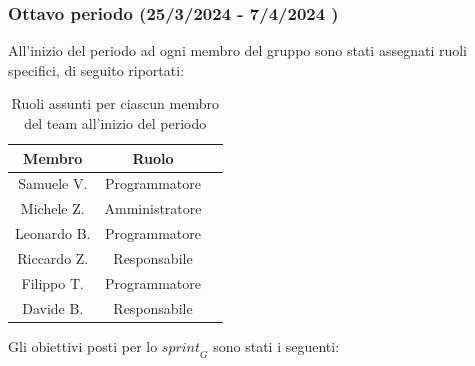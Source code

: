 \subsubsection{Ottavo periodo (25/3/2024 - 7/4/2024 )}
All'inizio del periodo ad ogni membro del gruppo sono stati assegnati ruoli specifici, di seguito riportati:
\begin{table}[H]
\centering
\begin{tabular}{|c|c|c|}
\hline
\textbf{Membro} & \textbf{Ruolo} \\
\hline
Samuele V. & Programmatore \\
\hline
Michele Z. & Amministratore \\
\hline
Leonardo B. & Programmatore \\
\hline
Riccardo Z. & Responsabile \\
\hline
Filippo T. & Programmatore \\
\hline
Davide B. & Responsabile \\
\hline
\end{tabular}
\caption{Ruoli assunti per ciascun membro del team all'inizio del periodo}
\end{table}
Gli obiettivi posti per lo $\textit{sprint}_G$ sono stati i seguenti:

